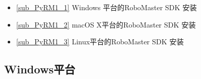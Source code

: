 
\begin{itemize}
\item \autoref{sub_PyRM1_1} Windows 平台的RoboMaster SDK 安装
\item \autoref{sub_PyRM1_2} macOS X平台的RoboMaster SDK 安装
\item \autoref{sub_PyRM1_3} Linux平台的RoboMaster SDK 安装
\end{itemize}


\subsection{Windows平台}\label{sub_PyRM1_1}
